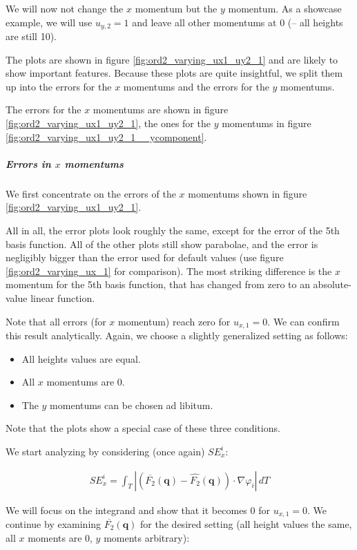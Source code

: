 \documentclass[a4paper, twoside]{article}
\renewcommand{\phi}{\varphi}
\begin{document}
We will now not change the $x$ momentum but the $y$ momentum. As a showcase example, we will use $u_{y,2}=1$ and leave all other momentums at 0 (-- all heights are still 10).

The plots are shown in figure \ref{fig:ord2_varying_ux1_uy2_1} and are likely to show important features. Because these plots are quite insightful, we split them up into the errors for the $x$ momentums and the errors for the $y$ momentums.

The errors for the $x$ momentums are shown in figure \ref{fig:ord2_varying_ux1_uy2_1}, the ones for the $y$ momentums in figure \ref{fig:ord2_varying_ux1_uy2_1__ycomponent}.

\subparagraph{\texorpdfstring{Errors in $x$ momentums}{Errors in x momentums}}

We first concentrate on the errors of the $x$ momentums shown in figure \ref{fig:ord2_varying_ux1_uy2_1}.



All in all, the error plots look roughly the same, except for the error of the 5th basis function. All of the other plots still show parabolae, and the error is negligibly bigger than the error used for default values (use figure \ref{fig:ord2_varying_ux_1} for comparison). The most striking difference is the $x$ momentum for the 5th basis function, that has changed from zero to an absolute-value linear function.

Note that all errors (for $x$ momentum) reach zero for $u_{x,1} = 0$. We can confirm this result analytically. Again, we choose a slightly generalized setting as follows:

\begin{itemize}
\item All heights values are equal.
\item All $x$ momentums are 0.
\item The $y$ momentums can be chosen ad libitum.
\end{itemize}

Note that the plots show a special case of these three conditions.

We start analyzing by considering (once again) $SE_x^i$:

\begin{align*}
  SE_x^i = \int_T \left| \left(\overline{F_2}(\mathbf{q}) - \widehat{F_2}(\mathbf{q})\right) \cdot \nabla \phi_i \right|\, dT
\end{align*}

We will focus on the integrand and show that it becomes 0 for $u_{x,1}=0$. We continue by examining $\overline{F_2}(\mathbf{q})$ for the desired setting (all height values the same, all $x$ moments are 0, $y$ moments arbitrary):
\end{document}
